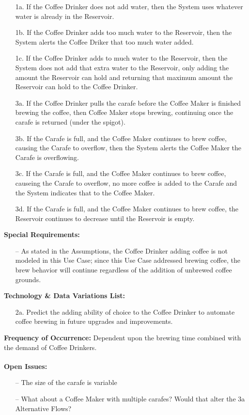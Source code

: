 \documentclass[letterpaper]{article}
\begin{document}
\begin{itemize}
\item[1a.]
If the Coffee Drinker does not add water, then the System uses
whatever water is already in the Reservoir.
\item[1b.]
If the Coffee Drinker adds too much water to the Reservoir, then the
System alerts the Coffee Driker that too much water added.
\item[1c.]
If the Coffee Drinker adds to much water to the Reservoir, then the
System does not add that extra water to the Reservoir, only adding the
amount the Reservoir can hold and returning that maximum amount the
Reservoir can hold to the Coffee Drinker.
\item[3a.]
If the Coffee Drinker pulls the carafe before the Coffee Maker
is finished brewing the coffee, then Coffee Maker stops brewing,
continuing once the carafe is returned (under the spigot).
\item[3b.]
If the Carafe is full, and the Coffee Maker continues to brew coffee,
causing the Carafe to overflow, then the System alerts the Coffee
Maker the Carafe is overflowing.
\item[3c.]
If the Carafe is full, and the Coffee Maker continues to brew coffee,
causeing the Carafe to overflow, no more coffee is added to the
Carafe and the System indicates that to the Coffee Maker.
\item[3d.]
If the Carafe is full, and the Coffee Maker continues to brew coffee,
the Reservoir continues to decrease until the Reservoir is empty.
\end{itemize}
\textbf{Special Requirements:  }
\begin{itemize}
\item [--]As stated in the Assumptions, the Coffee Drinker adding
coffee
is not modeled in this Use Case; since this Use Case addressed brewing
coffee, the brew behavior will continue regardless of the addition of
unbrewed coffee grounds.
\end{itemize}
\textbf{Technology \& Data Variations List: }
\begin{itemize}
\item[2a.] Predict the adding ability of choice to the Coffee Drinker
to automate coffee brewing in future upgrades and improvements.
\end{itemize}
\textbf{Frequency of Occurrence: } Dependent upon the brewing time
combined with the demand of Coffee Drinkers.\\\\
\textbf{Open Issues: }
\begin{itemize}
\item[--]The size of the carafe is variable
\item[--]What about a Coffee Maker with multiple carafes?  Would that
alter the 3a Alternative Flows?
\end{itemize}
\end{document}
